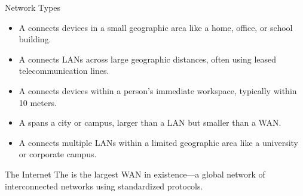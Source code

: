 \documentclass[aspectratio=169]{beamer}  %
\begin{document}
\begin{frame}{Network Types}
    \begin{itemize}
        \item A  connects devices in a small geographic area like a home, office, or school building.
        \item A  connects LANs across large geographic distances, often using leased telecommunication lines.
        \item A  connects devices within a person's immediate workspace, typically within 10 meters.
        \item A  spans a city or campus, larger than a LAN but smaller than a WAN.
        \item A  connects multiple LANs within a limited geographic area like a university or corporate campus.
    \end{itemize}
    
    \begin{alertblock}{The Internet}
        The  is the largest WAN in existence---a global network of interconnected networks using standardized protocols.
    \end{alertblock}
\end{frame}
\end{document}
